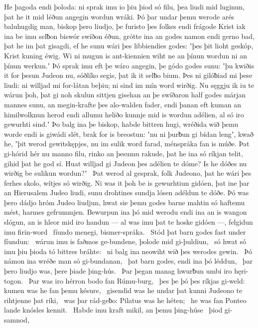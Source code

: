 He þagoda endi þoloda: ni sprak imu io þiu þiod só filu,
þea liudi mid luginun, þat he it mid léðun angegin
wordun wráki. Þó þar undar þemu werode arés
baluhugdig man, biskop þero liudjo,
þe furisto þes folkes endi frágode Krist
iak ina be imu selƀon biswór swíðon éðun,
grótte ina an godes namon endi gerno bad,
þat he im þat gisagdi, ef he sunu wári
þes libbiendies godes: ʽþes þit lioht geskóp,
Krist kuning éwig. Wi ni mugun is ant-kiennien wiht
ne an þínun wordun ni an þínun werkun.ʼ Þó sprak imu eft þe wáro angegin,
þe gódo godes sunu: ʽþu kwiðis it for þesun Judeon nu,
sóðlíko segis, þat ik it selƀo bium.
Þes ni gilóƀiad mi þese liudi: ni willjad mi for-látan beþiu;
ni sind im mín word wirðig. Nu sęggju ik iu te wárun þoh,
þat gi noh skulun sittjen gisehan an þe swíðaron half godes
márjan mannes sunu, an megin-krafte
þes alo-walden fader, endi þanan eft kuman
an himilwolknun herod endi allumu heliðo kunnje
mid is wordun adélien, al só iro gewurhti sind.ʼ
Þo balg ina þe biskop, habde bittren hugi,
wréðida wið þemu worde endi is giwádi slét,
brak for is breostun: ʽnu ni þurƀun gi bídan lengʼ, kwað he,
ʽþit werod gewitskępjes, nu im sulik word farad,
ménspráka fan is múðe. Þat gi-hórid hér nu manno filu,
rinko an þesumu rakude, þat he ina só ríkjan telit,
gihid þat he god sí. Huat willjad gi Judeon þes
adélien te dóme? Is he dóðes nu
wirðig be sulikun wordun?ʼ \hld\ Þat werod al gesprak,
folk Judeono, þat he wári þes ferhes skolo,
wítjes só wirðig. Ni was it þoh be is gewurhtiun gidóen,
þat ine þar an Hierusalem Judeo liudi,
sunu drohtines sundja lósen
adéldun te dóðe. Þó was þero dádjo hróm
Judeo liudjun, hwat sie þemu godes barne mahtin
só haftemu mést, harmes gefrummjen.
Bewurpun ina þó mid werodu endi ina an is wangon slógun,
an is hleor mid iro handun — al was imu þat te hoske gidóen —,
felgidun imu firin-word \hld\ fíundo menegi,
bismer-spráka. \hld\ Stód þat barn godes
fast under fíundun: \hld\ wárun imu is faðmos ge-bundene,
þolode mid gi-þuldiun, \hld\ só hwat só imu þiu þioda tó
bittres bráhte: \hld\ ni balg ina neowiht
wið þes werodes gewin. \hld\ Þó námon ina wréðe man
só gi-bundanan, \hld\ þat barn godes,
endi ina þó léddun, \hld\ þar þero liudjo was,
þere þiade þing-hús. \hld\ Þar þegan manag
hwurƀun umbi iro hęri-togon. \hld\ Þar was iro hérron bodo
fan Rúmu-burg, \hld\ þes þe þó þes ríkjas gi-weld:
kumen was he fan þemu késure, \hld\ gisendid was he undar þat kunni Judeono
te rihtjenne þat ríki, \hld\ was þar rád-geƀo:
Pilatus was he héten; \hld\ he was fan Ponteo lande
knósles kennit. \hld\ Habde imu kraft mikil,
an þemu þing-húse \hld\ þiod gi-samnod,
